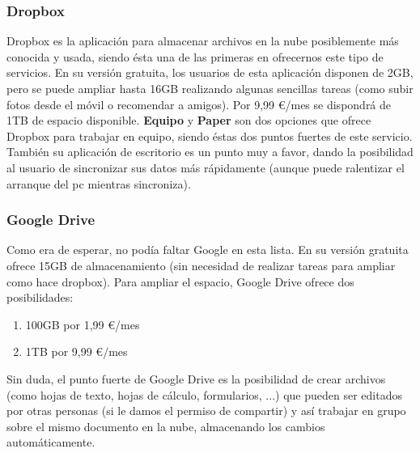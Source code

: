 \hfill\begin{minipage}{\dimexpr\textwidth-1cm}
\subsubsection{Dropbox \cite{cita_dropbox}}
Dropbox es la aplicación para almacenar archivos en la nube posiblemente más conocida y usada, siendo ésta una de las primeras en ofrecernos este tipo de servicios. En su versión gratuita, los usuarios de esta aplicación disponen de 2GB, pero se puede ampliar hasta 16GB realizando algunas sencillas tareas (como subir fotos desde el móvil o recomendar a amigos). Por 9,99 \euro/mes se dispondrá de 1TB de espacio disponible. \textbf{Equipo} y \textbf{Paper} son dos opciones que ofrece Dropbox para trabajar en equipo, siendo éstas dos puntos fuertes de este servicio. También su aplicación de escritorio es un punto muy a favor, dando la posibilidad al usuario de sincronizar sus datos más rápidamente (aunque puede ralentizar el arranque del pc mientras sincroniza). \\
\end{minipage}

\hfill\begin{minipage}{\dimexpr\textwidth-1cm}
\subsubsection{Google Drive \cite{cita_google_drive}}
Como era de esperar, no podía faltar Google en esta lista. En su versión gratuita ofrece 15GB de almacenamiento (sin necesidad de realizar tareas para ampliar como hace dropbox). Para ampliar el espacio, Google Drive ofrece dos posibilidades:
\begin{enumerate}[label=(\alph*)]
	\item 100GB por 1,99 \euro/mes
	\item 1TB por 9,99 \euro/mes
\end{enumerate}
Sin duda, el punto fuerte de Google Drive es la posibilidad de crear archivos (como hojas de texto, hojas de cálculo, formularios, ...) que pueden ser editados por otras personas (si le damos el permiso de compartir) y así trabajar en grupo sobre el mismo documento en la nube, almacenando los cambios automáticamente. \\
\end{minipage}

